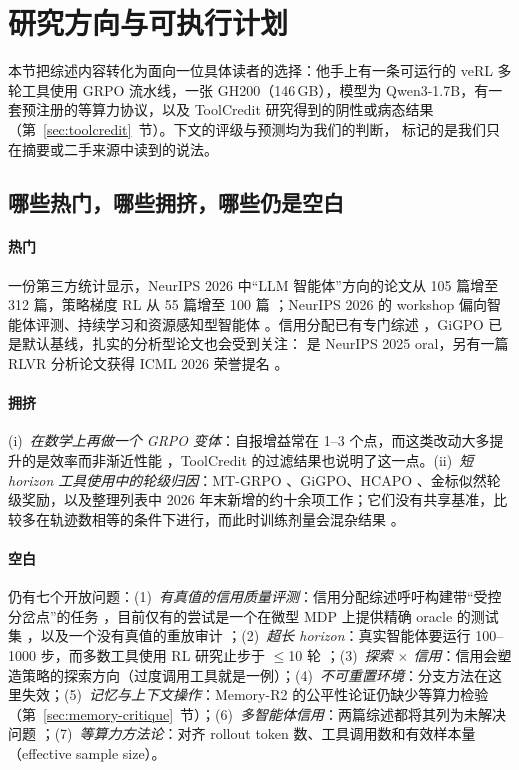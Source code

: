 \section{研究方向与可执行计划}\label{sec:agenda}

本节把综述内容转化为面向一位具体读者的选择：他手上有一条可运行的 veRL 多轮工具使用 GRPO 流水线，一张 GH200（146\,GB），模型为 Qwen3-1.7B，有一套预注册的等算力协议，以及 ToolCredit 研究得到的阴性或病态结果（第~\ref{sec:toolcredit}~节）。下文的评级与预测均为我们的判断，\unverified{} 标记的是我们只在摘要或二手来源中读到的说法。

\subsection{哪些热门，哪些拥挤，哪些仍是空白}

\paragraph{热门}
一份第三方统计显示，NeurIPS 2026 中“LLM 智能体”方向的论文从 105 篇增至 312 篇，策略梯度 RL 从 55 篇增至 100 篇 \citep{scime2026neurips}\unverified；NeurIPS 2026 的 workshop 偏向智能体评测、持续学习和资源感知型智能体 \citep{neurips2026announcing}。信用分配已有专门综述 \citep{zhang2026from}，GiGPO \citep{feng2025group} 已是默认基线，扎实的分析型论文也会受到关注：\citet{yue2025does} 是 NeurIPS 2025 oral，另有一篇 RLVR 分析论文获得 ICML 2026 荣誉提名 \citep{icml2026awards}。

\paragraph{拥挤}
(i)~\emph{在数学上再做一个 GRPO 变体}：自报增益常在 1--3 个点\unverified，而这类改动大多提升的是效率而非渐近性能 \citep{khatri2025art}，ToolCredit 的过滤结果也说明了这一点。(ii)~\emph{短 horizon 工具使用中的轮级归因}：MT-GRPO \citep{wei2025reinforcing}、GiGPO、HCAPO \citep{tan2026hindsight}、金标似然轮级奖励，以及整理列表中 2026 年末新增的约十余项工作\unverified；它们没有共享基准，比较多在轨迹数相等的条件下进行，而此时训练剂量会混杂结果 \citep{zhang2026credit}。

\paragraph{空白}
仍有七个开放问题：(1)~\emph{有真值的信用质量评测}：信用分配综述呼吁构建带“受控分岔点”的任务 \citep{zhang2026from}\unverified{}，目前仅有的尝试是一个在微型 MDP 上提供精确 oracle 的测试集 \citep{hectopascal2026agentcreditbench}\unverified{}，以及一个没有真值的重放审计 \citep{zhang2026credit}；(2)~\emph{超长 horizon}：真实智能体要运行 100--1000 步，而多数工具使用 RL 研究止步于 $\leq$10 轮 \citep{zhang2025landscape}；(3)~\emph{探索 $\times$ 信用}：信用会塑造策略的探索方向（过度调用工具就是一例）；(4)~\emph{不可重置环境}：分支方法在这里失效；(5)~\emph{记忆与上下文操作}：Memory-R2 的公平性论证仍缺少等算力检验（第~\ref{sec:memory-critique}~节）；(6)~\emph{多智能体信用}：两篇综述都将其列为未解决问题 \citep{zhang2025landscape,zhang2026from}；(7)~\emph{等算力方法论}：对齐 rollout token 数、工具调用数和有效样本量（effective sample size）。

